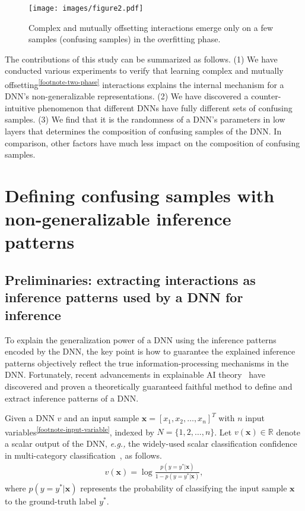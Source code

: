 \documentclass[10pt,twocolumn,letterpaper]{article}
\begin{document}
\begin{figure}[t]
    \centering
    \texttt{[image: images/figure2.pdf]}
    \vspace{-10pt}
    \caption{Complex and mutually offsetting interactions emerge only on a few samples (confusing samples) in the overfitting phase.}
    \label{ref::fig2}
\end{figure}



The contributions of this study can be summarized as follows. (1)
We have conducted various experiments to verify that learning complex and mutually offsetting\textsuperscript{\ref{footnote-two-phase}} interactions explains the internal mechanism for a DNN's non-generalizable representations. (2) We have discovered a counter-intuitive phenomenon that different DNNs have fully different sets of confusing samples. (3) We find that it is the randomness of a DNN's parameters in low layers that determines the composition of confusing samples of the DNN. In comparison, other factors have much less impact on the composition of confusing samples.


\section{Defining confusing samples with non-generalizable inference patterns}
\subsection{Preliminaries: extracting interactions as inference patterns used by a DNN for inference}
To explain the generalization power of a DNN using the inference patterns encoded by the DNN, the key point is how to guarantee the explained inference patterns objectively reflect the true information-processing mechanisms in the DNN. Fortunately, recent advancements in explainable AI theory~\citep{li2023does, ren2023defining, ren2024we} have discovered and proven a theoretically guaranteed faithful method to define and extract inference patterns of a DNN.


Given a DNN $v$ and an input sample \(\mathbf{x} = [x_1, x_2, \ldots, x_n]^T\) with \( n \) input variables\textsuperscript{\ref{footnote-input-variable}}, indexed by \( N = \{1, 2, \ldots, n\} \). Let \( v(\mathbf{x}) \in \mathbb{R} \) denote a scalar output of the DNN, \emph{e.g.,} the widely-used scalar classification confidence in multi-category classification~\citep{deng2022discovering}, as follows.
{
\small
\begin{align}
    v(\mathbf{x}) = \log \frac{p(y=y^{*}|\mathbf{x})}{1-p(y=y^{*}|\mathbf{x})},
\end{align}
}
where \( p(y = y^{*} | \mathbf{x}) \) represents the probability of classifying the input sample $\mathbf{x}$ to the ground-truth label $y^*$.
\end{document}
